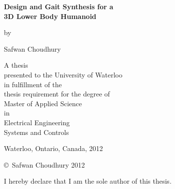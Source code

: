 \pagestyle{empty}


\begin{titlepage}
    \begin{center}
        \vspace*{1.0cm}

        \Huge
        {\bf Design and Gait Synthesis for a \\ 3D Lower Body Humanoid}

        \vspace*{1.0cm}

        \normalsize
        by \\

        \vspace*{1.0cm}

        \Large
        Safwan Choudhury \\

        \vspace*{3.0cm}

        \normalsize
        A thesis \\
        presented to the University of Waterloo \\ 
        in fulfillment of the \\
        thesis requirement for the degree of \\
        Master of Applied Science \\
        in \\
        Electrical Engineering\\
 		Systems and Controls \\

        \vspace*{2.0cm}

        Waterloo, Ontario, Canada, 2012 \\

        \vspace*{1.0cm}

        \copyright\ Safwan Choudhury 2012 \\
    \end{center}
\end{titlepage}

\pagestyle{plain}
\setcounter{page}{2}

\cleardoublepage


\noindent
I hereby declare that I am the sole author of this thesis. 

